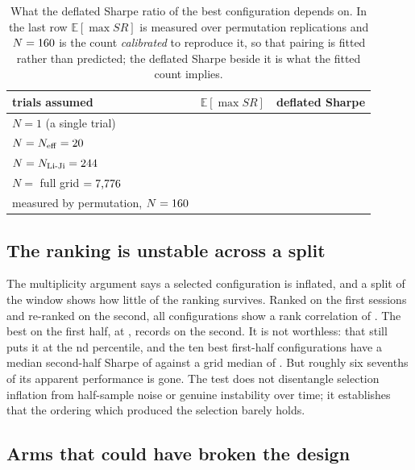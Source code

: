 \documentclass[sigconf]{acmart}
\begin{document}
\begin{table}[t]
\centering
\caption{What the deflated Sharpe ratio of the best configuration depends on. In the last row $\mathbb{E}[\max SR]$ is
measured over \PermReps{} permutation replications and $N=160{}$ is the count
\emph{calibrated} to reproduce it, so that pairing is fitted rather than predicted; the deflated
Sharpe beside it is what the fitted count implies.}
\label{tab:multiplicity}
\small
\begin{tabular}{lrr}
\toprule
trials assumed & $\mathbb{E}[\max SR]$ & deflated Sharpe \\
\midrule
$N=1$ (a single trial)               & \EmaxOne{}   & \DSRone{} \\
$N=N_{\mathrm{eff}}=20{}$         & \EmaxNeff{}  & \DSRneff{} \\
$N=N_{\mathrm{Li\text{-}Ji}}=244{}$ & \EmaxLiJi{} & \DSRliji{} \\
$N=$ full grid $=\mbox{7,776{}}$      & \EmaxFull{}  & \DSRfull{} \\
\midrule
measured by permutation, $N=160{}$ & \EmaxMeasured{} & \DSRimplied{} \\
\bottomrule
\end{tabular}
\end{table}

\subsection{The ranking is unstable across a split}
\label{sec:split}

The multiplicity argument says a selected configuration is inflated, and a split of the window shows
how little of the ranking survives. Ranked on the first \SplitSessions{} sessions and re-ranked on
the second, all \NumConfigs{} configurations show a rank correlation of \SplitSpearman{}. The best on the first
half, at \SplitISBest{}, records \SplitOOSofISBest{} on the second. It is not worthless: that still
puts it at the \SplitOOSPercentile{}nd percentile, and the ten best first-half configurations have a
median second-half Sharpe of \SplitOOSTopTen{} against a grid median of \SplitOOSMedian{}. But
roughly six sevenths of its apparent performance is gone. The test does not disentangle selection
inflation from half-sample noise or genuine instability over time; it establishes that the ordering
which produced the selection barely holds.

\subsection{Arms that could have broken the design}
\label{sec:probes}
\end{document}
